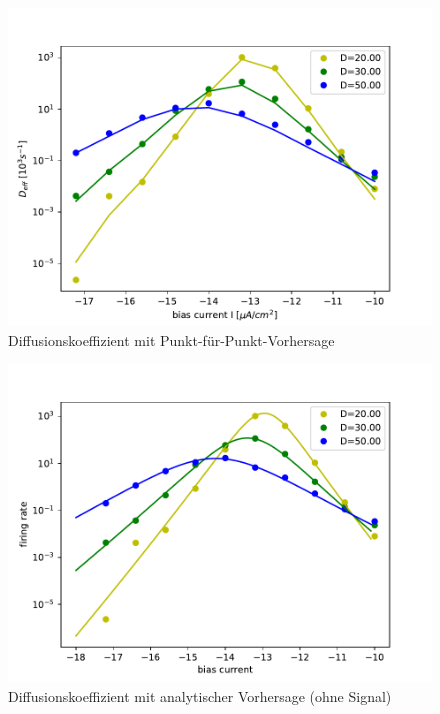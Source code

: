 \documentclass[12pt,a4paper]{article}
\begin{document}
\begin{figure}[H]
	\centering
	\includegraphics[scale=1]{dcompdfpwnewrealrinzel25orealrinzel15ninv0.pdf}\caption{Diffusionskoeffizient mit Punkt-für-Punkt-Vorhersage}
	\label{drin}
\end{figure}
\begin{figure}[H]
	\centering
	\includegraphics[scale=1]{dcomprate25o.pdf}\caption{Diffusionskoeffizient mit analytischer Vorhersage (ohne Signal)}
	\label{drinana}
\end{figure}
\end{document}
